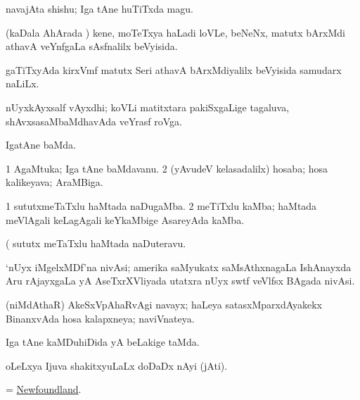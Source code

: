 \bentry
{}
\gl{\nA}
\bmng
navajAta shishu; Iga tAne huTiTxda magu. 
\emng
\eentry

\bentry
{}
\gl{\gu}
\bmng
(kaDala AhArada \vi) kene, moTeTxya haLadi loVLe, beNeNx, matutx bArxMdi athavA veYnfgaLa sAsfnalilx beVyisida. 
\emng

\noindent
\gl{\pagu}
\bmng
{} gaTiTxyAda kirxVmf matutx Seri athavA bArxMdiyalilx beVyisida samudarx naLiLx. 
\emng
\eentry

\bentry
{}
\gl{\nA}
\bmng
nUyxkAyxsalf vAyxdhi; koVLi matitxtara pakiSxgaLige tagaluva, shAvxsasaMbaMdhavAda veYrasf roVga. 
\emng
\eentry

\bentry
{}
\gl{\gu}
\bmng
IgatAne baMda. 
\emng
\eentry

\bentry
{}
\gl{\nA}
\bmng
\bnum
\num{1} AgaMtuka; Iga tAne baMdavanu. 
\num{2} (yAvudeV kelasadalilx) hosaba; hosa kalikeyava; AraMBiga. 
\enum
\emng
\eentry

\bentry
{}
\gl{\nA}
\bmng
\bnum
\num{1} sututxmeTaTxlu haMtada naDugaMba. 
\num{2} meTiTxlu kaMba; haMtada meVlAgali keLagAgali keYkaMbige AsareyAda kaMba. 
\enum
\emng

\noindent
\gl{\pagu}
\bmng
{} (  sututx meTaTxlu haMtada naDuteravu. 
\emng
\eentry

\bentry
{}
\gl{\nA}
\bmng
`nUyx iMgelxMDf'na nivAsi; amerika saMyukatx saMsAthxnagaLa IshAnayxda Aru rAjayxgaLa yA AseTxrXVliyada utatxra nUyx swtf veVlfsx BAgada nivAsi. 
\emng
\eentry

\bentry
{}
\gl{\gu}
\bmng
(niMdAthaR) AkeSxVpAhaRvAgi navayx; haLeya satasxMparxdAyakekx BinanxvAda hosa kalapxneya; naviVnateya. 
\emng
\eentry

\bentry
{}
\gl{\gu}
\bmng
Iga tAne kaMDuhiDida yA beLakige taMda. 
\emng
\eentry

\bentry
{}
\gl{\nA}
\bmng
oLeLxya Ijuva shakitxyuLaLx doDaDx nAyi (jAti).  
\emng
\eentry

\bentry
{}
\gl{\nA}
\bmng
= \hyperlink{Newfoundland}{Newfoundland}. 
\emng
\eentry


